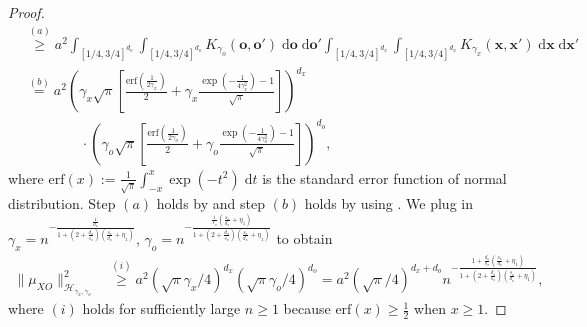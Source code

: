 \documentclass[11pt]{article}
\newcommand{\bx}{\mathbf x}
\newcommand{\bo}{\mathbf o}
\newcommand{\calH}{\mathcal{H}}
\newcommand{\0}{\mathbf{0}}
\begin{document}
\begin{appendix}
\begin{proof}
\begin{align*}
    &\stackrel{(a)}{\geq} a^2\int_{[1/4,3/4]^{d_o}}\int_{[1/4,3/4]^{d_o}} K_{\gamma_o}(\bo,\bo')\;\mathrm{d}\bo\;\mathrm{d}\bo'\int_{[1/4,3/4]^{d_x}}\int_{[1/4,3/4]^{d_x}} K_{\gamma_x}(\bx,\bx') \;\mathrm{d}\bx\;\mathrm{d}\bx'\\
    &\stackrel{(b)} = a^2 \left(\gamma_x \sqrt{\pi} \left[\frac{\mathrm{erf}\left(\frac{1}{2\gamma_x}\right)}{2} + \gamma_x\frac{\exp\left(-\frac{1}{4\gamma_x^2}\right)-1}{\sqrt{\pi}}\right]\right)^{d_x} \\
    &\qquad\qquad \cdot \left(\gamma_o \sqrt{\pi} \left[\frac{\mathrm{erf}\left(\frac{1}{2\gamma_o}\right)}{2} + \gamma_o\frac{\exp\left(-\frac{1}{4\gamma_o^2}\right)-1}{\sqrt{\pi}}\right]\right)^{d_o},
\end{align*}
where $\mathrm{erf}(x) := \frac{1}{\sqrt{\pi}}\int^{x}_{-x}\exp\left(-t^2\right)\;\mathrm{d}t$
is the standard error function of normal distribution. Step $(a)$ holds by  and step $(b)$ holds by using . We plug in $\gamma_x = n^{-\frac{\frac{1}{d_x}}{1+(2+\frac{d_o}{s_o})(\frac{s_x}{d_x}+\eta_1)}}$, $\gamma_o = n^{-\frac{\frac{1}{s_o}(\frac{s_x}{d_x}+\eta_1)}{1+(2+\frac{d_o}{s_o})(\frac{s_x}{d_x}+\eta_1)}}$ to obtain
\begin{align*}
    \|\mu_{XO}\|^2_{\calH_{\gamma_x,\gamma_o}} &\stackrel{(i)}{\geq} a^2\left(\sqrt{\pi}\gamma_x/4\right)^{d_x}\left(\sqrt{\pi}\gamma_o/4\right)^{d_o} = a^2 (\sqrt{\pi}/4)^{d_x+d_o} n^{-\frac{1+\frac{d_o}{s_o}(\frac{s_x}{d_x}+\eta_1)}{1+(2+\frac{d_o}{s_o})(\frac{s_x}{d_x}+\eta_1)}},
\end{align*}
where $(i)$ holds for sufficiently large $n\geq 1$ because $\mathrm{erf}(x)\geq \frac{1}{2}$ when $x\geq 1$. 
\end{proof}


\end{appendix}
\end{document}
